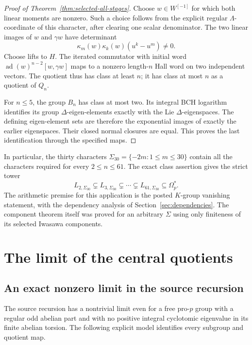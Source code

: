 \documentclass[11pt]{article}
\theoremstyle{definition}\newtheorem{definition}[theorem]{Definition}
\begin{document}
\begin{proof}[Proof of Theorem~\ref{thm:selected-all-stages}]
Choose \(w\in W^{[-1]}\) for which both linear moments
are nonzero. Such a choice follows from the explicit regular
\(\Lambda\)-coordinate of this character, after clearing
one scalar denominator. The two linear images of \(w\)
and \(\gamma w\) have determinant
\[
             \kappa_m(w)\kappa_k(w)(u^k-u^m)\ne0.
\]
Choose lifts to \(H\). The iterated commutator with initial
word \(\operatorname{ad}(w)^{n-2}[w,\gamma w]\) maps to a
nonzero length-\(n\) Hall word on two independent vectors.
The quotient thus has class at least \(n\); it has class
at most \(n\) as a quotient of \(Q_n\).

For \(n\leq5\), the group \(B_n\) has class at most two.
Its integral BCH logarithm identifies its group
\(\Delta\)-eigen-elements exactly with the Lie
\(\Delta\)-eigenspaces. The defining eigen-element sets are therefore the exponential images of exactly the earlier eigenspaces. Their closed normal closures are equal. This proves the
last identification through the specified maps.
\end{proof}

In particular, the thirty characters
\(\Sigma_{30}=\{-2m:1\leq m\leq30\}\) contain all the
characters required for every \(2\leq n\leq61\).
The exact class assertion gives the strict tower
\[
 L_{2,\Sigma_{30}}\subsetneq L_{3,\Sigma_{30}}
 \subsetneq\cdots\subsetneq L_{61,\Sigma_{30}}
 \subseteq\Omega_p^*.
\]
The arithmetic premise for this application is the posted
\(K\)-group vanishing statement, with the dependency analysis
of Section~\ref{sec:dependencies}. The component theorem
itself was proved for an arbitrary \(\Sigma\) using only
finiteness of its selected Iwasawa components.

\section{The limit of the central quotients}
\label{sec:source-limit}

\subsection{An exact nonzero limit in the source recursion}
\label{subsec:limit-countermodel}

The source recursion has a nontrivial limit even for
a free pro-$p$ group with a regular odd abelian part
and with no positive integral cyclotomic eigenvalue
in its finite abelian torsion. The following explicit
model identifies every subgroup and quotient map.
\end{document}
